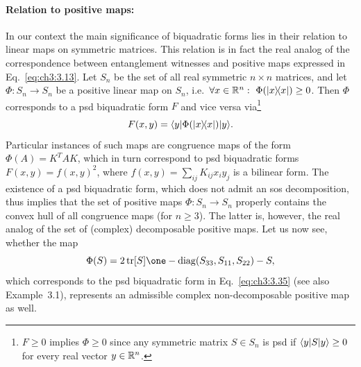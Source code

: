 \documentclass[11pt,a4paper]{article}
\numberwithin{equation}{section}
\begin{document}
\paragraph{Relation to positive maps:}
In our context the main significance of biquadratic forms lies in their relation to linear maps on symmetric
matrices. This relation is in fact the real analog of the correspondence between entanglement witnesses and positive
maps expressed in Eq.~\eqref{eq:ch3:3.13}. Let $S_n$ be the set of all real symmetric $n\times n$ matrices, and let
$\Phi:S_n\to S_n$ be a positive linear map on $S_n$, i.e.\ $\forall x\in\RR^n:\ \Phi(\ketbra{x}{x})\ge 0$. Then $\Phi$
corresponds to a psd biquadratic form $F$ and vice versa via\footnote{$F\ge 0$ implies $\Phi\ge 0$ since any symmetric
    matrix $S\in S_n$ is psd if $\langle y|S|y\rangle\ge 0$ for every real vector $y\in \mathbb{R}^n$.}
\begin{equation}\label{eq:ch3:3.37}
    F(x,y)=\langle y|\Phi(|x\rangle\!\langle x|)|y\rangle.
\end{equation}
Particular instances of such maps are congruence maps of the form $\Phi(A)=K^T AK$, which in turn correspond to psd
biquadratic forms $F(x,y)=f(x,y)^2$, where $f(x,y)=\sum_{ij}K_{ij}x_i y_j$ is a bilinear form. The existence of a psd
biquadratic form, which does not admit an sos decomposition, thus implies that the set of positive maps $\Phi:S_n\to S_n$
properly contains the convex hull of all congruence maps (for $n\ge 3$). The latter is, however, the real analog of
the set of (complex) decomposable positive maps. Let us now see, whether the map
\begin{equation}\label{eq:ch3:3.38}
    \Phi(S)=2\tr[S]\one - \operatorname{diag}(S_{33},S_{11},S_{22}) - S,
\end{equation}
which corresponds to the psd biquadratic form in Eq.~\eqref{eq:ch3:3.35} (see also Example~3.1), represents an
admissible complex non-decomposable positive map as well.
\end{document}
